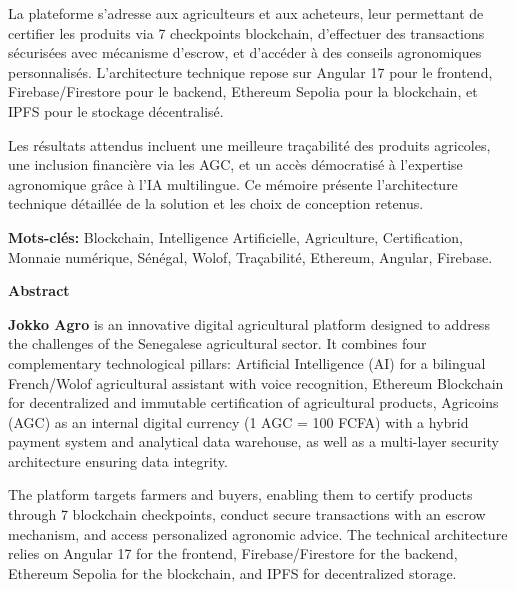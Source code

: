 \documentclass[12pt,a4paper]{report}
\begin{document}
\vspace{0.4cm}
\noindent
La plateforme s'adresse aux agriculteurs et aux acheteurs, leur permettant de certifier les produits via 7 checkpoints blockchain, d'effectuer des transactions sécurisées avec mécanisme d'escrow, et d'accéder à des conseils agronomiques personnalisés. L'architecture technique repose sur Angular 17 pour le frontend, Firebase/Firestore pour le backend, Ethereum Sepolia pour la blockchain, et IPFS pour le stockage décentralisé.

\vspace{0.4cm}
\noindent
Les résultats attendus incluent une meilleure traçabilité des produits agricoles, une inclusion financière via les AGC, et un accès démocratisé à l'expertise agronomique grâce à l'IA multilingue. Ce mémoire présente l'architecture technique détaillée de la solution et les choix de conception retenus.

\vspace{0.4cm}
\noindent
\textbf{Mots-clés:} Blockchain, Intelligence Artificielle, Agriculture, Certification, Monnaie numérique, Sénégal, Wolof, Traçabilité, Ethereum, Angular, Firebase.

\clearpage
\thispagestyle{empty}
\vspace*{1cm}
\begin{center}
  {\Huge\bfseries\color{bleuUniv} Abstract}
\end{center}
\vspace{0.5cm}
\noindent
\textbf{Jokko Agro} is an innovative digital agricultural platform designed to address the challenges of the Senegalese agricultural sector. It combines four complementary technological pillars: Artificial Intelligence (AI) for a bilingual French/Wolof agricultural assistant with voice recognition, Ethereum Blockchain for decentralized and immutable certification of agricultural products, Agricoins (AGC) as an internal digital currency (1 AGC = 100 FCFA) with a hybrid payment system and analytical data warehouse, as well as a multi-layer security architecture ensuring data integrity.

\vspace{0.4cm}
\noindent
The platform targets farmers and buyers, enabling them to certify products through 7 blockchain checkpoints, conduct secure transactions with an escrow mechanism, and access personalized agronomic advice. The technical architecture relies on Angular 17 for the frontend, Firebase/Firestore for the backend, Ethereum Sepolia for the blockchain, and IPFS for decentralized storage.
\end{document}
